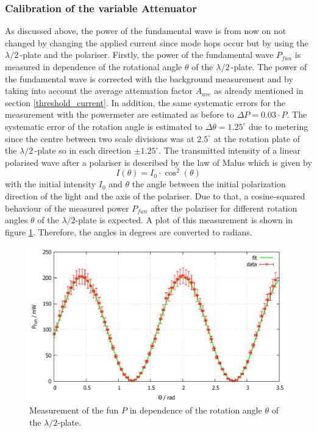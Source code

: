 \documentclass[10pt, a4paper, notitlepage, DIV=15]{scrartcl}
\begin{document}
\subsubsection{Calibration of the variable Attenuator}
As discussed above, the power of the fundamental wave is from now on not changed by changing the applied current since mode hops occur but by using the $\lambda/2\,$-plate and the polariser. Firstly, the power of the fundamental wave $P_{fun}$ is measured in dependence of the rotational angle $\theta$ of the $\lambda/2\,$-plate. The power of the fundamental wave is corrected with the background measurement and by taking into account the average attenuation factor $A_{ave}$ as already mentioned in section \ref{threshold_current}. In addition, the same systematic errors for the measurement with the powermeter are estimated as before to $\Delta P = 0.03\cdot P$. The systematic error of the rotation angle is estimated to $\Delta \theta=1.25^\circ$ due to metering since the centre between two scale divisions was at $2.5^\circ$ at the rotation plate of the $\lambda/2\,$-plate so in each direction $\pm 1.25^\circ$. The transmitted intensity of a linear polarised wave after a polariser is described by the law of Malus which is given by \cite{zinth}
\begin{equation}
	I(\theta)=I_0\cdot \cos^2(\theta)
\end{equation}
with the initial intensity $I_0$ and $\theta$ the angle between the initial polarization direction of the light and the axis of the polariser. Due to that, a cosine-squared behaviour of the measured power $P_{fun}$ after the polariser for different rotation angles $\theta$ of the $\lambda/2$-plate is expected. A plot of this measurement is shown in figure \ref{fig:output_pow_angle}. Therefore, the angles in degrees are converted to radians.
\begin{figure}[h]
	\centering
	\includegraphics[width=1\textwidth]{Gnuplot/fun_angle}
	\caption{Measurement of the fun $P$ in dependence of the rotation angle $\theta$ of the $\lambda/2$-plate.}
	\label{fig:output_pow_angle}
\end{figure}
\end{document}
